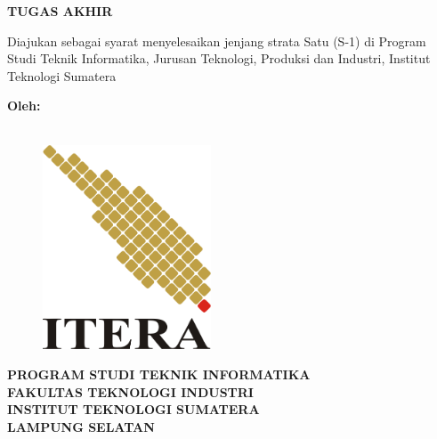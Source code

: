 \clearpage
\pagestyle{empty}

\begin{center}
\smallskip
	
	\begin{center}
		\fontsize{16pt}{14pt}
		\bfseries \MakeUppercase{\thetitle}
		\vfill
	    \uppercase{Tugas Akhir}
	    \vfill
		
		\normalfont Diajukan sebagai syarat menyelesaikan jenjang strata Satu (S-1) di Program Studi Teknik Informatika, Jurusan Teknologi, Produksi dan Industri, Institut Teknologi Sumatera
		\vfill
	\end{center}

	\large \bfseries Oleh:\\
    \large \bfseries \theauthor\\
    \printnim
    \vfill
    
    \begin{figure}[h]
    	\centering
    	\includegraphics[width=5cm, keepaspectratio]{resources/itera-logo}
    \end{figure}
    \vfill

    \normalsize \bfseries
    \uppercase{
        Program Studi Teknik Informatika \\
        Fakultas Teknologi Industri\\
        Institut Teknologi Sumatera\\
        Lampung Selatan
    }\\
    \the\year{}

\end{center}

\clearpage
